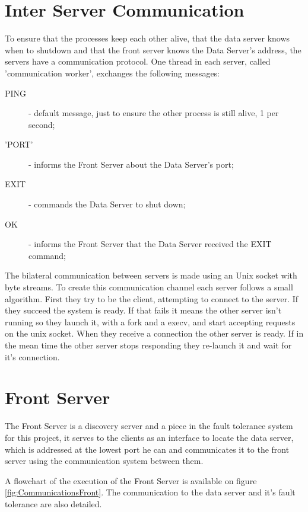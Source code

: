 \documentclass[12pt]{article} %
\begin{document}
\section{Inter Server Communication}
\label{sec:CommunicationProtocol}
To ensure that the processes keep each other alive, that the data server knows when 
to shutdown and  that the front server knows the Data Server's address, the servers 
have a communication protocol. One thread in each server, called 'communication 
worker', exchanges the following messages:
  \begin{description}
    \item[PING] - default message, just to ensure the other process is still alive, 1 per second;
    \item['PORT'] - informs the Front Server about the Data Server's port;
    \item[EXIT] - commands the Data Server to shut down;
    \item[OK] - informs the Front Server that the Data Server received the EXIT command;
  \end{description}

The bilateral communication between servers is made using an Unix socket with 
byte streams. To create this communication channel each server follows a small 
algorithm. First they try to be the client, attempting to connect to the server. 
If they succeed the system is ready. If that fails it means the other server isn't 
running so they launch it, with a fork and a execv, and start accepting requests 
on the unix socket. When they receive a connection the other server is ready. If 
in the mean time the other server stops responding they re-launch it and wait for 
it's connection.

\section{Front Server}
\label{sec:FrontServer}

The Front Server is a discovery server and a piece in the fault tolerance system for this project,
it serves to the clients as an interface to locate the data server, which is addressed at the lowest port he can
and communicates it to the front server using the communication system between them.

A flowchart of the execution of the Front Server is available on figure \ref{fig:CommunicationsFront}. 
The communication to the data server and it's fault tolerance are also detailed.
\end{document}
